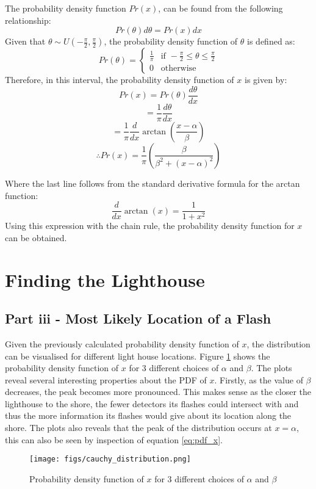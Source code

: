 \documentclass[11pt]{article}
\begin{document}
The probability density function $Pr(x)$, can be found from the following relationship:
\[
Pr(\theta)d\theta = Pr(x)dx
\]
Given that \( \theta \sim U(-\frac{\pi}{2}, \frac{\pi}{2}) \),
the probability density function of \( \theta \) is defined as:
\[
Pr(\theta) = \left\{
    \begin{array}{ll}
        \frac{1}{\pi} & \text{if } -\frac{\pi}{2} \leq \theta \leq \frac{\pi}{2} \\
        0 & \text{otherwise}
    \end{array}
\right.
\]
Therefore, in this interval, the probability density function of \( x \) is given by:
$$
Pr(x) = Pr(\theta)\frac{d\theta}{dx} 
$$
$$
= \frac{1}{\pi} \frac{d\theta}{dx}
$$
$$
= \frac{1}{\pi} \frac{d}{dx} \arctan \left( \frac{x-\alpha}{\beta} \right)
$$
\begin{equation}
\therefore Pr(x) = \frac{1}{\pi} \left( \frac{\beta}{\beta^2 + (x-\alpha)^2} \right)
\label{eq:pdf_x}
\end{equation}

Where the last line follows from the standard derivative formula for the arctan function:
\[
\frac{d}{dx} \arctan(x) = \frac{1}{1+x^2}
\]
Using this expression with the chain rule, the probability density function for \( x \) can be obtained.

\section{Finding the Lighthouse}
\subsection{Part iii - Most Likely Location of a Flash}
Given the previously calculated probability density function of \( x \), the distribution can be visualised for different light house locations. Figure \ref{fig:cauchy_distribution} shows the probability density function of \( x \) for 3 different choices of \( \alpha \) and \( \beta \). The plots reveal several interesting properties about the PDF of $x$. Firstly, as the value of $\beta$ decreases, the peak
becomes more pronounced. This makes sense as the closer the lighthouse to the shore, the fewer detectors its flashes could intersect with and thus the more information its flashes would give about its location along the shore. The plots also reveals that the peak of the distribution occurs at $x=\alpha$, this can also be seen by inspection of equation \ref{eq:pdf_x}. 

\begin{figure}[H]
    \centering
    \texttt{[image: figs/cauchy\_distribution.png]}
    \caption{Probability density function of \( x \) for 3 different choices of \( \alpha \) and \( \beta \)}
    \label{fig:cauchy_distribution}
\end{figure}
\end{document}
